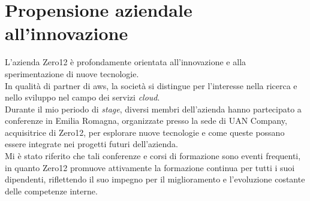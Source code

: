 \pagebreak
\section{Propensione aziendale all'innovazione}
\label{sez:propensione-a-innovazione}

L'azienda Zero12 è profondamente orientata all'innovazione e alla sperimentazione di nuove tecnologie.\\
In qualità di partner di \gls{aws}, la società si distingue per l'interesse nella ricerca e nello sviluppo nel campo dei servizi \textit{cloud}.\\ 

\noindent Durante il mio periodo di \textit{stage}, diversi membri dell'azienda hanno partecipato a conferenze in Emilia Romagna, organizzate presso la sede di UAN Company, acquisitrice di Zero12, per esplorare nuove tecnologie e come queste possano essere integrate nei progetti futuri dell'azienda.\\ 
Mi è stato riferito che tali conferenze e corsi di formazione sono eventi frequenti, in quanto Zero12 promuove attivamente la formazione continua per tutti i suoi dipendenti, riflettendo il suo impegno per il miglioramento e l'evoluzione costante delle competenze interne.
